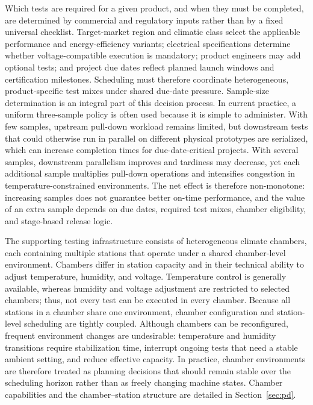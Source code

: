 Which tests are required for a given product, and when they must be completed, are determined by commercial and regulatory inputs rather than by a fixed universal checklist. Target-market region and climatic class select the applicable performance and energy-efficiency variants; electrical specifications determine whether voltage-compatible execution is mandatory; product engineers may add optional tests; and project due dates reflect planned launch windows and certification milestones. Scheduling must therefore coordinate heterogeneous, product-specific test mixes under shared due-date pressure. Sample-size determination is an integral part of this decision process. In current practice, a uniform three-sample policy is often used because it is simple to administer. With few samples, upstream pull-down workload remains limited, but downstream tests that could otherwise run in parallel on different physical prototypes are serialized, which can increase completion times for due-date-critical projects. With several samples, downstream parallelism improves and tardiness may decrease, yet each additional sample multiplies pull-down operations and intensifies congestion in temperature-constrained environments. The net effect is therefore non-monotone: increasing samples does not guarantee better on-time performance, and the value of an extra sample depends on due dates, required test mixes, chamber eligibility, and stage-based release logic.

The supporting testing infrastructure consists of heterogeneous climate chambers, each containing multiple stations that operate under a shared chamber-level environment. Chambers differ in station capacity and in their technical ability to adjust temperature, humidity, and voltage. Temperature control is generally available, whereas humidity and voltage adjustment are restricted to selected chambers; thus, not every test can be executed in every chamber. Because all stations in a chamber share one environment, chamber configuration and station-level scheduling are tightly coupled. Although chambers can be reconfigured, frequent environment changes are undesirable: temperature and humidity transitions require stabilization time, interrupt ongoing tests that need a stable ambient setting, and reduce effective capacity. In practice, chamber environments are therefore treated as planning decisions that should remain stable over the scheduling horizon rather than as freely changing machine states. Chamber capabilities and the chamber--station structure are detailed in Section~\ref{sec:pd}.


